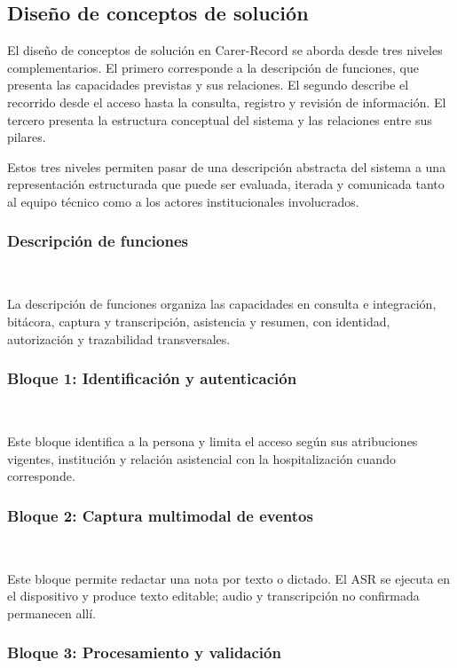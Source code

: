 
\subsection{Diseño de conceptos de solución}

El diseño de conceptos de solución en Carer-Record se aborda desde tres niveles complementarios. El primero corresponde a la descripción de funciones, que presenta las capacidades previstas y sus relaciones. El segundo describe el recorrido desde el acceso hasta la consulta, registro y revisión de información. El tercero presenta la estructura conceptual del sistema y las relaciones entre sus pilares.

Estos tres niveles permiten pasar de una descripción abstracta del sistema a una representación estructurada que puede ser evaluada, iterada y comunicada tanto al equipo técnico como a los actores institucionales involucrados.\\

\subsubsection*{Descripción de funciones} ~

La descripción de funciones organiza las capacidades en consulta e integración, bitácora, captura y transcripción, asistencia y resumen, con identidad, autorización y trazabilidad transversales.\\

\subsubsection*{Bloque 1: Identificación y autenticación} ~

Este bloque identifica a la persona y limita el acceso según sus atribuciones vigentes, institución y relación asistencial con la hospitalización cuando corresponde.\\

\subsubsection*{Bloque 2: Captura multimodal de eventos} ~

Este bloque permite redactar una nota por texto o dictado. El ASR se ejecuta en el dispositivo y produce texto editable; audio y transcripción no confirmada permanecen allí.\\

\subsubsection*{Bloque 3: Procesamiento y validación} ~


